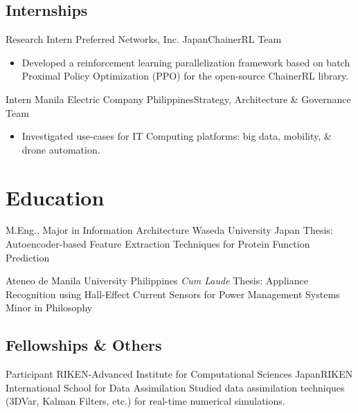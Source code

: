 \documentclass[12pt,a4paper]{moderncv}
\begin{document}
\subsection{Internships}

{Research Intern}
{Preferred Networks, Inc.}
{Japan}{ChainerRL Team}
{
    \begin{itemize}
        \item Developed a reinforcement learning parallelization
              framework based on batch Proximal Policy Optimization (PPO)
              for the open-source ChainerRL library.
    \end{itemize}
}

{Intern}
{Manila Electric Company}
{Philippines}{Strategy, Architecture \& Governance Team}
{
    \begin{itemize}
        \item Investigated use-cases for IT Computing platforms: big
              data, mobility, \& drone automation.
    \end{itemize}
}


\section{Education}
{M.Eng., Major in Information Architecture}
{Waseda University}
{Japan}{}
{Thesis: Autoencoder-based Feature Extraction Techniques for Protein
    Function Prediction}

{Ateneo de Manila University}
{Philippines}
{\textit{Cum Laude}}
{
    Thesis: Appliance Recognition using Hall-Effect Current Sensors for
    Power Management Systems\\
    Minor in Philosophy
}


\subsection{Fellowships \& Others}

{Participant}
{RIKEN-Advanced Institute for Computational Sciences}
{Japan}{RIKEN International School for Data Assimilation}
{Studied data assimilation techniques (3DVar, Kalman Filters, etc.) for real-time numerical simulations.}
\end{document}
